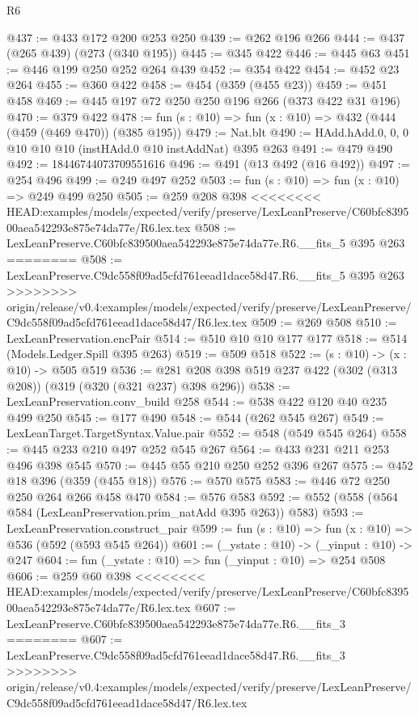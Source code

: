 \begin{lexlean}{R6}
\begin{coremodule}
{{{{{{{{{{{{{{{@437 := @433 @172 @200 @253 @250
@439 := @262 @196 @266
@444 := @437 (@265 @439) (@273 (@340 @195))
@445 := @345 @422
@446 := @445 @63
@451 := @446 @199 @250 @252 @264 @439
@452 := @354 @422
@454 := @452 @23 @264
@455 := @360 @422
@458 := @454 (@359 (@455 @23))
@459 := @451 @458
@469 := @445 @197 @72 @250 @250 @196 @266 (@373 @422 @31 @196)
@470 := @379 @422
@478 := fun (s : @10) => fun (x : @10) => @432 (@444 (@459 (@469 @470)) (@385 @195))
@479 := Nat.blt
@490 := HAdd.hAdd.{0, 0, 0} @10 @10 @10 (instHAdd.{0} @10 instAddNat) @395 @263
@491 := @479 @490
@492 := 18446744073709551616
@496 := @491 (@13 @492 (@16 @492))
@497 := @254 @496
@499 := @249 @497 @252
@503 := fun (s : @10) => fun (x : @10) => @249 @499 @250
@505 := @259 @208 @398
<<<<<<<< HEAD:examples/models/expected/verify/preserve/LexLeanPreserve/C60bfc839500aea542293e875e74da77e/R6.lex.tex
@508 := LexLeanPreserve.C60bfc839500aea542293e875e74da77e.R6.__fits_5 @395 @263
========
@508 := LexLeanPreserve.C9dc558f09ad5cfd761eead1dace58d47.R6.__fits_5 @395 @263
>>>>>>>> origin/release/v0.4:examples/models/expected/verify/preserve/LexLeanPreserve/C9dc558f09ad5cfd761eead1dace58d47/R6.lex.tex
@509 := @269 @508
@510 := LexLeanPreservation.encPair
@514 := @510 @10 @10 @177 @177
@518 := @514 (Models.Ledger.Spill @395 @263)
@519 := @509 @518
@522 := (s : @10) -> (x : @10) -> @505 @519
@536 := @281 @208 @398 @519 @237 @422 (@302 (@313 @208)) (@319 (@320 (@321 @237) @398 @296))
@538 := LexLeanPreservation.conv_build @258
@544 := @538 @422 @120 @40 @235 @499 @250
@545 := @177 @490
@548 := @544 (@262 @545 @267)
@549 := LexLeanTarget.TargetSyntax.Value.pair
@552 := @548 (@549 @545 @264)
@558 := @445 @233 @210 @497 @252 @545 @267
@564 := @433 @231 @211 @253 @496 @398 @545
@570 := @445 @55 @210 @250 @252 @396 @267
@575 := @452 @18 @396 (@359 (@455 @18))
@576 := @570 @575
@583 := @446 @72 @250 @250 @264 @266 @458 @470
@584 := @576 @583
@592 := @552 (@558 (@564 @584 (LexLeanPreservation.prim_natAdd @395 @263)) @583)
@593 := LexLeanPreservation.construct_pair
@599 := fun (s : @10) => fun (x : @10) => @536 (@592 (@593 @545 @264))
@601 := (_ystate : @10) -> (_yinput : @10) -> @247
@604 := fun (_ystate : @10) => fun (_yinput : @10) => @254 @508
@606 := @259 @60 @398
<<<<<<<< HEAD:examples/models/expected/verify/preserve/LexLeanPreserve/C60bfc839500aea542293e875e74da77e/R6.lex.tex
@607 := LexLeanPreserve.C60bfc839500aea542293e875e74da77e.R6.__fits_3
========
@607 := LexLeanPreserve.C9dc558f09ad5cfd761eead1dace58d47.R6.__fits_3
>>>>>>>> origin/release/v0.4:examples/models/expected/verify/preserve/LexLeanPreserve/C9dc558f09ad5cfd761eead1dace58d47/R6.lex.tex
}}}}}}}}}}}}}}}
\end{coremodule}
\end{lexlean}
